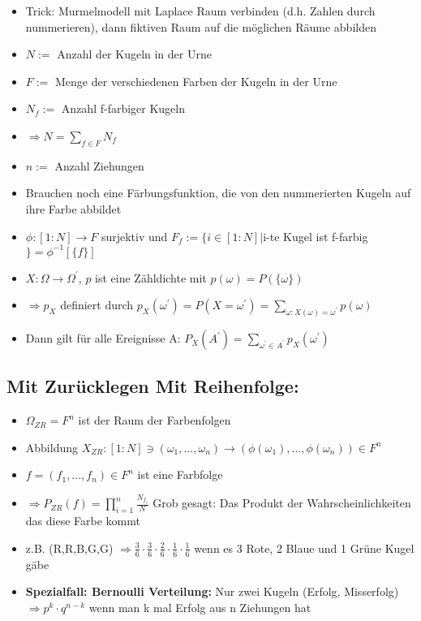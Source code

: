 \documentclass[a4paper,11pt]{scrartcl}
\begin{document}
\begin{itemize}
    \item Trick: Murmelmodell mit Laplace Raum verbinden (d.h. Zahlen durch nummerieren), dann fiktiven Raum auf die möglichen Räume abbilden
    \item $N :=$ Anzahl der Kugeln in der Urne
    \item $F :=$ Menge der verschiedenen Farben der Kugeln in der Urne
    \item $N_f:=$ Anzahl f-farbiger Kugeln
    \item $\Rightarrow N = \sum_{f \in F} N_f$
    \item $n :=$ Anzahl Ziehungen
    \item Brauchen noch eine Färbungsfunktion, die von den nummerierten Kugeln auf ihre Farbe abbildet
    \item $\phi :[1:N] \rightarrow F$ surjektiv und $F_f := \{ i \in [1:N] | $i-te Kugel ist f-farbig$\} = \phi^{-1}[\{f\}]$
    \item $X: \Omega \rightarrow \Omega^{\prime}$, $p$ ist eine Zähldichte mit $ p(\omega) = P(\{\omega\})$
    \item $\Rightarrow p_X$ definiert durch $p_X(\omega^{\prime}) = P(X=\omega^\prime) = \sum_{\omega: X(\omega) = \omega^\prime} p(\omega)$
    \item Dann gilt für alle Ereignisse A: $P_X(A^\prime) = \sum_{\omega^\prime \in A^\prime} p_X(\omega^\prime)$
\end{itemize}

\subsection{Mit Zurücklegen Mit Reihenfolge:}

\begin{itemize}
    \item $\Omega_{ZR} = F^n$ ist der Raum der Farbenfolgen
    \item Abbildung $X_{ZR}:[1:N] \ni (\omega_1,...,\omega_n) \rightarrow (\phi (\omega_1),...,\phi (\omega_n)) \in F^n$
    \item $f = (f_1,...,f_n) \in F^n$ ist eine Farbfolge
    \item $\Rightarrow P_{ZR}(f) = \prod_{i=1}^n \frac{N_{f_i}}{N}$ Grob gesagt: Das Produkt der Wahrscheinlichkeiten das diese Farbe kommt
    \item z.B. (R,R,B,G,G) $\Rightarrow \frac{3}{6} \cdot \frac{3}{6} \cdot \frac{2}{6} \cdot \frac{1}{6} \cdot \frac{1}{6}$ wenn es 3 Rote, 2 Blaue und 1 Grüne Kugel gäbe
    \item \textbf{Spezialfall: Bernoulli Verteilung:} Nur zwei Kugeln (Erfolg, Misserfolg) $\Rightarrow p^k \cdot q^{n-k}$ wenn man k mal Erfolg aus n Ziehungen hat
\end{itemize}
\end{document}
